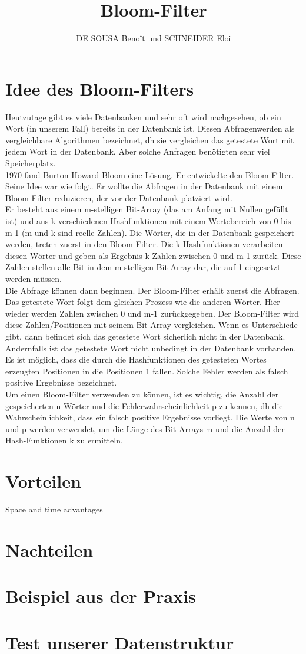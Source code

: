 \documentclass[12pt, letterpaper]{article}
\title{Bloom-Filter}
\author{DE SOUSA Benoît und SCHNEIDER Eloi}
\begin{document}
\maketitle

\section{Idee des Bloom-Filters}
Heutzutage gibt es viele Datenbanken und sehr oft wird nachgesehen, ob ein Wort (in unserem Fall) bereits in der Datenbank ist. Diesen Abfragenwerden als vergleichbare Algorithmen bezeichnet, dh sie vergleichen das getestete Wort mit jedem Wort in der Datenbank. Aber solche Anfragen benötigten sehr viel Speicherplatz.\\
1970 fand Burton Howard Bloom eine Lösung. Er entwickelte den Bloom-Filter.\\
Seine Idee war wie folgt. Er wollte die Abfragen in der Datenbank mit einem Bloom-Filter reduzieren, der vor der Datenbank platziert wird.\\
Er besteht aus einem m-stelligen Bit-Array (das am Anfang mit Nullen gefüllt ist) und aus k verschiedenen Hashfunktionen mit einem Wertebereich von 0 bis m-1 (m und k sind reelle Zahlen). Die Wörter, die in der Datenbank gespeichert werden, treten zuerst in den Bloom-Filter. Die k Hashfunktionen verarbeiten diesen Wörter und geben als Ergebnis k Zahlen zwischen 0 und m-1 zurück. Diese Zahlen stellen alle Bit in dem m-stelligen Bit-Array dar, die auf 1 eingesetzt werden müssen.\\
Die Abfrage können dann beginnen. Der Bloom-Filter erhält zuerst die Abfragen. Das getestete Wort folgt dem gleichen Prozess wie die anderen Wörter. Hier wieder werden Zahlen zwischen 0 und m-1 zurückgegeben. Der Bloom-Filter wird diese Zahlen/Positionen mit seinem Bit-Array vergleichen. Wenn es Unterschiede gibt, dann befindet sich das getestete Wort sicherlich nicht in der Datenbank. Andernfalls ist das getestete Wort nicht unbedingt in der Datenbank vorhanden. Es ist möglich, dass die durch die Hashfunktionen des getesteten Wortes erzeugten Positionen in die Positionen 1 fallen. Solche Fehler werden als falsch positive Ergebnisse bezeichnet.\\
Um einen Bloom-Filter verwenden zu können, ist es wichtig, die Anzahl der gespeicherten n Wörter und die Fehlerwahrscheinlichkeit p zu kennen, dh die Wahrscheinlichkeit, dass ein falsch positive Ergebnisse vorliegt. Die Werte von n und p werden verwendet, um die Länge des Bit-Arrays m und die Anzahl der Hash-Funktionen k zu ermitteln.

\section{Vorteilen}

Space and time advantages

\section{Nachteilen}

\section{Beispiel aus der Praxis}

\section{Test unserer Datenstruktur}
\end{document}

